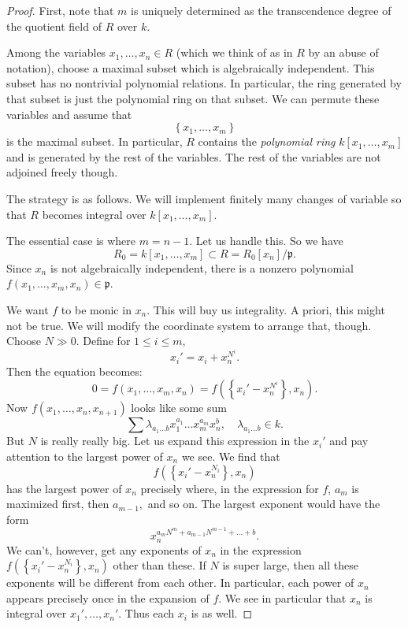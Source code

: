 \begin{proof} 
First, note that $m$ is uniquely determined as the transcendence degree of the
quotient field of $R$ over $k$. 	

Among the variables $x_1, \dots, x_n \in R$ (which we think of as in $R$ by an
abuse of notation), choose a maximal subset which is algebraically independent.
This subset has no nontrivial polynomial relations. In particular, the ring
generated by that subset is just the polynomial ring on that subset.
We can permute these variables and assume that
$$\left\{x_1,\dots, x_m\right\}$$ is the maximal subset. In particular, $R$
contains the \emph{polynomial ring} $k[x_1, \dots, x_m]$ and is generated by
the rest of the variables. The rest of the variables are not adjoined freely
though. 

The strategy is as follows.  We will implement finitely many changes of
variable so that $R$ becomes integral over $k[x_1, \dots, x_m]$. 

The essential case is where $m=n-1$. Let us handle this. So we have 
\[ R_0 = k[x_1, \dots, x_m]  \subset R = R_0[x_n]/\mathfrak{p}.  \]
Since $x_n$ is not algebraically independent, there is a nonzero polynomial
$f(x_1, \dots, x_m, x_n) \in \mathfrak{p}$. 

We want $f$ to be monic in $x_n$. This will buy us integrality. A priori, this
might not be true. We will modify the coordinate system to arrange that,
though. Choose $N \gg 0$. Define for $1 \leq i \leq m$,
\[ x_i' = x_i + x_n^{N^i}.  \]
Then the equation becomes:
\[ 0 = f(x_1, \dots, x_m, x_n) = f( \left\{x_i' - x_n^{N^i}\right\} , x_n). \]
Now $f(x_1, \dots, x_n, x_{n+1})$ looks like some sum
\[ \sum \lambda_{a_1 \dots b} x_1^{a_1} \dots x_m^{a_m} x_n^{b} , \quad
\lambda_{a_1 \dots b} \in k. \]
But $N$ is really really big. Let us expand this expression in the $x_i'$ and
pay attention to the largest power of $x_n$ we see. 
We find that
\[ f(\left\{x_i' - x_n^{N_i}\right\},x_n)
\]
has the largest power of $x_n$ precisely where, in the expression for $f$,  $a_m$ is maximized first, then
$a_{m-1}, $ and so on. The largest exponent would have the form
\[ x_n^{a_m N^m + a_{m-1}N^{m-1} + \dots + b}.  \]
We can't, however, get any exponents of $x_n$ in the expression 
\( f(\left\{x_i' - x_n^{N_i}\right\},x_n)\) other than these. If $N$ is super
large, then all these exponents will be different from each other. 
In particular, each power of $x_n$ appears precisely once in the expansion of
$f$. We see in particular that $x_n$ is integral over $x_1', \dots, x_n'$. 
Thus each $x_i$ is as well.


\end{proof}
